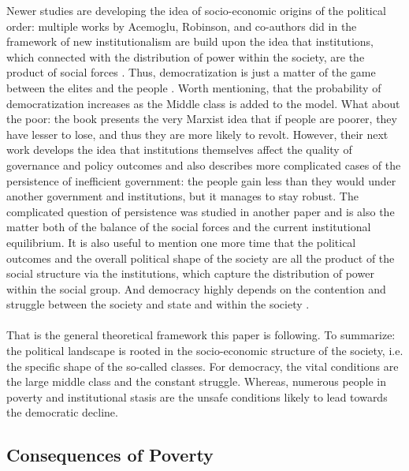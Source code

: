 \documentclass[a4paper, 12pt]{article}
\begin{document}
	Newer studies are developing the idea of socio-economic origins of the political order: multiple works by Acemoglu, Robinson, and co-authors did in the framework of new institutionalism are build upon the idea that institutions, which connected with the distribution of power within the society, are the product of social forces \parencite{inst_per}. Thus, democratization is just a matter of the game between the elites and the people \parencite{econ_origins}. Worth mentioning, that the probability of democratization increases as the Middle class is added to the model. What about the poor: the book presents the very Marxist idea that if people are poorer, they have lesser to lose, and thus they are more likely to revolt. However, their next work \parencite{why_fail} develops the idea that institutions themselves affect the quality of governance and policy outcomes and also describes more complicated cases of the persistence of inefficient government: the people gain less than they would under another government and institutions, but it manages to stay robust. The complicated question of persistence was studied in another paper \parencite{gov_pers} and is also the matter both of the balance of the social forces and the current institutional equilibrium. It is also useful to mention one more time that the political outcomes and the overall political shape of the society are all the product of the social structure via the institutions, which capture the distribution of power within the social group. And democracy highly depends on the contention and struggle between the society and state and within the society \parencite{corridor, contention}.
	\\\\
	That is the general theoretical framework this paper is following. To summarize: the political landscape is rooted in the socio-economic structure of the society, i.e. the specific shape of the so-called classes. For democracy, the vital conditions are the large middle class and the constant struggle. Whereas, numerous people in poverty and institutional stasis are the unsafe conditions likely to lead towards the democratic decline.
	
	\subsection{Consequences of Poverty}
	
\end{document}
